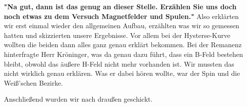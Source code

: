 \noindent \textbf{"Na gut, dann ist das genug an dieser Stelle. Erzählen Sie uns doch noch etwas zu dem Versuch Magnetfelder und Spulen."} 
Also erklärten wir erst einmal wieder den allgemeinen Aufbau, erzählten was wir so gemessen hatten und skizzierten unsere Ergebnisse. 
Vor allem bei der Hysterse-Kurve wollten die beiden dann alles ganz genau erklärt bekommen. Bei der Remanenz hinterfragte Herr Kröninger, 
was da genau dazu führt, dass ein B-Feld bestehen bleibt, obwohl das äußere H-Feld nicht mehr vorhanden ist. Wir mussten das nicht wirklich 
genau erklären. Was er dabei hören wollte, war der Spin und die Weiß'schen Bezirke.

\noindent Anschließend wurden wir nach draußen geschickt.

